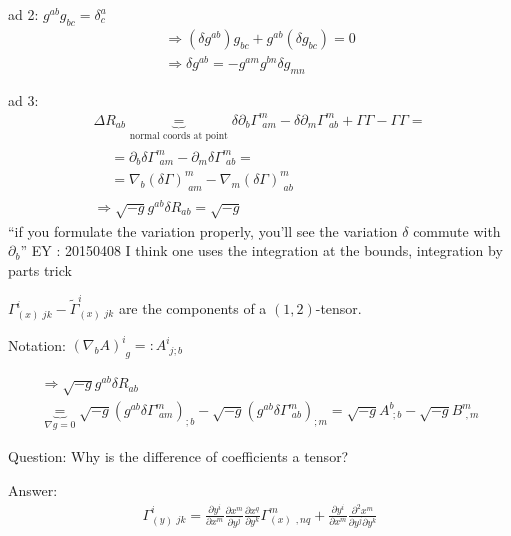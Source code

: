 \documentclass[10pt]{amsart}
\begin{document}
\begin{multicols*}{2}
	ad 2: $g^{ab}g_{bc} = \delta^a_c$
	\[
	\begin{gathered}
	\Longrightarrow (\delta g^{ab})g_{bc} + g^{ab}(\delta g_{bc}) = 0  \\
	\Longrightarrow \delta g^{ab} = -g^{am} g^{bn} \delta g_{mn}
	\end{gathered}
	\]
	
	ad 3: 
	\[
	\begin{gathered}
	\Delta R_{ab} \underbrace{=}_{\text{normal coords at point}} \delta \partial_b \Gamma^m_{ \, \, am} - \delta \partial_m \Gamma^m_{ \, \, ab} + \Gamma \Gamma - \Gamma \Gamma = \\
	\begin{aligned}
	& = \partial_b \delta \Gamma^m_{ \, \, am} - \partial_m \delta \Gamma^m_{ \, \, ab } = \\  
	& = \nabla_b (\delta \Gamma)^m_{ \, \, am} - \nabla_m (\delta \Gamma)^m_{ \, \, ab}
	\end{aligned} \\
	\Longrightarrow \sqrt{-g} g^{ab} \delta R_{ab} = \sqrt{-g}
	\end{gathered}
	\]
	``if you formulate the variation properly, you'll see the variation $\delta$ commute with $\partial _b$'' EY : 20150408 I think one uses the integration at the bounds, integration by parts trick
	
	$\Gamma^i_{(x) \, \, jk } - \widetilde{\Gamma}^i_{ (x) \, \, jk }$ are the components of a $(1,2)$-tensor.
	
	Notation: $(\nabla_b A)^i_{ \, \, g} =: A^i_{ \, \, j;b}$
	
	\[
	\begin{gathered}
	\Longrightarrow \sqrt{-g} g^{ab} \delta R_{ab}  \\
	\underbrace{=}_{ \nabla g = 0 } \sqrt{-g} (g^{ab} \delta \Gamma^m_{ \, \, am} )_{;b} - \sqrt{-g} (g^{ab} \delta \Gamma^m_{ \, \, ab} )_{ ; m} = \sqrt{-g} A^b_{ \, \, ; b} - \sqrt{-g} B^m_{ \, \, , m }
	\end{gathered}
	\]
	
	Question: Why is the difference of coefficients a tensor?
	
	Answer:
	\[
	\begin{aligned}
	\Gamma_{(y) \, \, jk}^i = \frac{ \partial y^i}{ \partial x^m} \frac{ \partial x^m}{ \partial y^j} \frac{ \partial x^q}{ \partial y^k} \Gamma^m_{(x) \,\ , nq} + \frac{ \partial y^i}{ \partial x^m} \frac{ \partial^2 x^m}{ \partial y^j \partial y^k}
	\end{aligned}
	\]
	

\end{multicols*}
\end{document}

